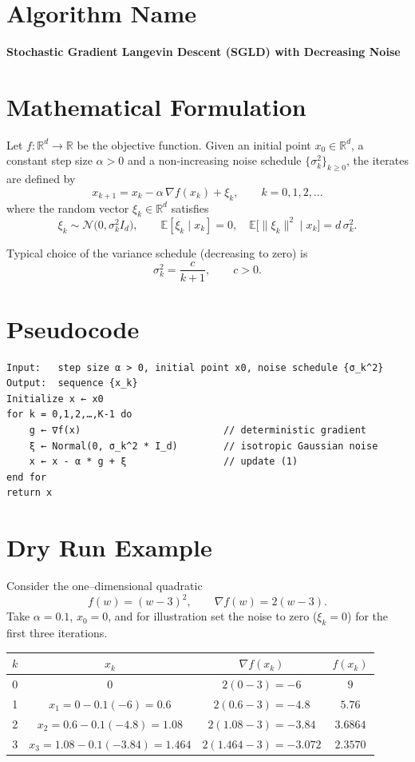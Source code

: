 \documentclass{article}
\newcommand{\EE}{\mathbb{E}}
\newcommand{\RR}{\mathbb{R}}
\begin{document}
\section*{Algorithm Name}
\textbf{Stochastic Gradient Langevin Descent (SGLD) with Decreasing Noise}

\section*{Mathematical Formulation}
Let $f:\RR^{d}\rightarrow\RR$ be the objective function.  
Given an initial point $x_{0}\in\RR^{d}$, a constant step size $\alpha>0$ and a
non‑increasing noise schedule $\{\sigma_{k}^{2}\}_{k\ge 0}$, the iterates are
defined by
\[
\boxed{
x_{k+1}=x_{k}-\alpha\,\nabla f(x_{k})+\xi_{k}},\qquad k=0,1,2,\dots
\tag{1}
\]
where the random vector $\xi_{k}\in\RR^{d}$ satisfies
\[
\xi_{k}\sim\mathcal{N}\bigl(0,\sigma_{k}^{2}I_{d}\bigr),\qquad 
\EE[\xi_{k}\mid x_{k}]=0,\quad
\EE\bigl[\|\xi_{k}\|^{2}\mid x_{k}\bigr]=d\,\sigma_{k}^{2}.
\tag{2}
\]

Typical choice of the variance schedule (decreasing to zero) is
\[
\sigma_{k}^{2}=\frac{c}{k+1},\qquad c>0.
\tag{3}
\]

\section*{Pseudocode}
\begin{verbatim}
Input:   step size α > 0, initial point x0, noise schedule {σ_k^2}
Output:  sequence {x_k}
Initialize x ← x0
for k = 0,1,2,…,K-1 do
    g ← ∇f(x)                         // deterministic gradient
    ξ ← Normal(0, σ_k^2 * I_d)        // isotropic Gaussian noise
    x ← x - α * g + ξ                 // update (1)
end for
return x
\end{verbatim}

\section*{Dry Run Example}
Consider the one–dimensional quadratic
\[
f(w)=(w-3)^{2},\qquad \nabla f(w)=2(w-3).
\]
Take $\alpha=0.1$, $x_{0}=0$, and for illustration set the noise to zero
($\xi_{k}=0$) for the first three iterations.

\begin{center}
\begin{tabular}{c|c|c|c}
$k$ & $x_{k}$ & $\nabla f(x_{k})$ & $f(x_{k})$\\\hline
0 & $0$ & $2(0-3)=-6$ & $9$\\
1 & $x_{1}=0-0.1(-6)=0.6$ & $2(0.6-3)=-4.8$ & $5.76$\\
2 & $x_{2}=0.6-0.1(-4.8)=1.08$ & $2(1.08-3)=-3.84$ & $3.6864$\\
3 & $x_{3}=1.08-0.1(-3.84)=1.464$ & $2(1.464-3)=-3.072$ & $2.3570$
\end{tabular}
\end{center}
\end{document}
